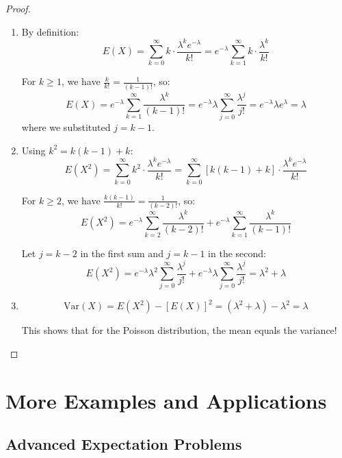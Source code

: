 \begin{proof}
\begin{enumerate}[label=(\alph*)]
    \item By definition:
    \[
    E(X) = \sum_{k=0}^{\infty} k \cdot \frac{\lambda^k e^{-\lambda}}{k!} = e^{-\lambda} \sum_{k=1}^{\infty} k \cdot \frac{\lambda^k}{k!}
    \]
    
    For \(k \geq 1\), we have \(\frac{k}{k!} = \frac{1}{(k-1)!}\), so:
    \[
    E(X) = e^{-\lambda} \sum_{k=1}^{\infty} \frac{\lambda^k}{(k-1)!} = e^{-\lambda} \lambda \sum_{j=0}^{\infty} \frac{\lambda^j}{j!} = e^{-\lambda} \lambda e^{\lambda} = \lambda
    \]
    where we substituted \(j = k-1\).
    
    \item Using \(k^2 = k(k-1) + k\):
    \[
    E(X^2) = \sum_{k=0}^{\infty} k^2 \cdot \frac{\lambda^k e^{-\lambda}}{k!} = \sum_{k=0}^{\infty} [k(k-1) + k] \cdot \frac{\lambda^k e^{-\lambda}}{k!}
    \]
    
    For \(k \geq 2\), we have \(\frac{k(k-1)}{k!} = \frac{1}{(k-2)!}\), so:
    \[
    E(X^2) = e^{-\lambda} \sum_{k=2}^{\infty} \frac{\lambda^k}{(k-2)!} + e^{-\lambda} \sum_{k=1}^{\infty} \frac{\lambda^k}{(k-1)!}
    \]
    
    Let \(j = k-2\) in the first sum and \(j = k-1\) in the second:
    \[
    E(X^2) = e^{-\lambda} \lambda^2 \sum_{j=0}^{\infty} \frac{\lambda^j}{j!} + e^{-\lambda} \lambda \sum_{j=0}^{\infty} \frac{\lambda^j}{j!} = \lambda^2 + \lambda
    \]
    
    \item 
    \[
    \text{Var}(X) = E(X^2) - [E(X)]^2 = (\lambda^2 + \lambda) - \lambda^2 = \lambda
    \]
    
    This shows that for the Poisson distribution, the mean equals the variance!
\end{enumerate}
\end{proof}

\newpage

\section{More Examples and Applications}

\subsection{Advanced Expectation Problems}

